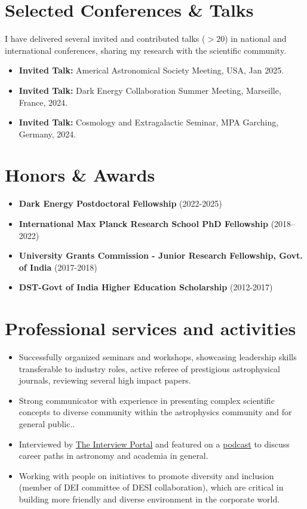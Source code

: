\documentclass[a4paper,10pt]{article}
\begin{document}
\section*{Selected Conferences \& Talks}
I have delivered several invited and contributed talks ($>20$) in national and international conferences, sharing my research with the scientific community.
\begin{itemize}[noitemsep, topsep=0pt]
\item \textbf{Invited Talk:} Americal Astronomical Society Meeting, USA, Jan 2025.
\item \textbf{Invited Talk:} Dark Energy Collaboration Summer Meeting, Marseille, France, 2024.
    \item \textbf{Invited Talk:} Cosmology and Extragalactic Seminar, MPA Garching, Germany, 2024.
\end{itemize}

\section*{Honors \& Awards}
\begin{itemize}[noitemsep, topsep=0pt]
 \item \textbf{Dark Energy Postdoctoral Fellowship} (2022-2025)
    \item \textbf{International Max Planck Research School PhD Fellowship} (2018–2022)
    \item \textbf{University Grants Commission - Junior Research Fellowship, Govt. of India} (2017-2018)
     \item \textbf{DST-Govt of India Higher Education Scholarship}  (2012-2017)
\end{itemize}

\section*{Professional services and activities}
\begin{itemize}[noitemsep, topsep=0pt]
    \item Successfully organized seminars and workshops, showcasing leadership skills
transferable to industry roles, active referee of prestigious astrophysical journals, reviewing several high impact papers.
     \item Strong communicator with experience in presenting complex scientific concepts to diverse community within the astrophysics community and for general public..
    \item Interviewed by \href{https://theinterviewportal.com/2020/03/13/astrophysicist-interview-8/}{The Interview Portal} and featured on a \href{https://www.youtube.com/watch?v=WmA_PnYLeCg}{podcast} to discuss career paths in astronomy and academia in general.
    \item Working with people on initiatives to promote diversity and inclusion (member of DEI committee
of DESI collaboration), which are critical in building more friendly and diverse environment in the
corporate world.
\end{itemize}
\end{document}
